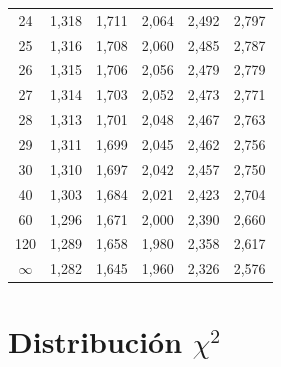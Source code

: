 \begin{table}[ht]
\begin{tabular}{@{}c|ccccc@{}}
24 & 1{,}318 & 1{,}711 & 2{,}064 & 2{,}492 & 2{,}797 \\
25 & 1{,}316 & 1{,}708 & 2{,}060 & 2{,}485 & 2{,}787 \\
26 & 1{,}315 & 1{,}706 & 2{,}056 & 2{,}479 & 2{,}779 \\
27 & 1{,}314 & 1{,}703 & 2{,}052 & 2{,}473 & 2{,}771 \\
28 & 1{,}313 & 1{,}701 & 2{,}048 & 2{,}467 & 2{,}763 \\
29 & 1{,}311 & 1{,}699 & 2{,}045 & 2{,}462 & 2{,}756 \\
30 & 1{,}310 & 1{,}697 & 2{,}042 & 2{,}457 & 2{,}750 \\
40 & 1{,}303 & 1{,}684 & 2{,}021 & 2{,}423 & 2{,}704 \\
60 & 1{,}296 & 1{,}671 & 2{,}000 & 2{,}390 & 2{,}660 \\
120 & 1{,}289 & 1{,}658 & 1{,}980 & 2{,}358 & 2{,}617 \\
$\infty$ & 1{,}282 & 1{,}645 & 1{,}960 & 2{,}326 & 2{,}576 \\
\bottomrule
\end{tabular}
\end{table}

\section{Distribución \texorpdfstring{$\chi^{2}$}{chi cuadrado}}

